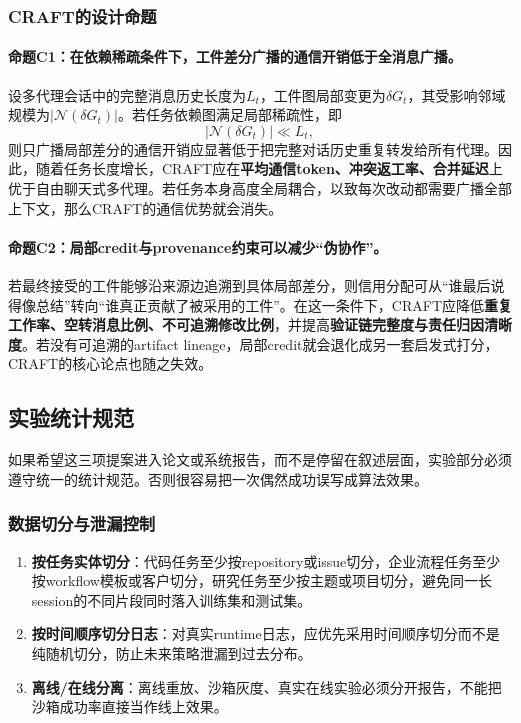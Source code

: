 \documentclass[12pt,a4paper]{article}
\begin{document}
\subsubsection{CRAFT的设计命题}

\paragraph{命题C1：在依赖稀疏条件下，工件差分广播的通信开销低于全消息广播。}
设多代理会话中的完整消息历史长度为$L_t$，工件图局部变更为$\delta G_t$，其受影响邻域规模为$|\mathcal{N}(\delta G_t)|$。若任务依赖图满足局部稀疏性，即
\begin{equation}
|\mathcal{N}(\delta G_t)| \ll L_t,
\end{equation}
则只广播局部差分的通信开销应显著低于把完整对话历史重复转发给所有代理。因此，随着任务长度增长，CRAFT应在\textbf{平均通信token、冲突返工率、合并延迟}上优于自由聊天式多代理。若任务本身高度全局耦合，以致每次改动都需要广播全部上下文，那么CRAFT的通信优势就会消失。

\paragraph{命题C2：局部credit与provenance约束可以减少“伪协作”。}
若最终接受的工件能够沿来源边追溯到具体局部差分，则信用分配可从“谁最后说得像总结”转向“谁真正贡献了被采用的工件”。在这一条件下，CRAFT应降低\textbf{重复工作率、空转消息比例、不可追溯修改比例}，并提高\textbf{验证链完整度与责任归因清晰度}。若没有可追溯的artifact lineage，局部credit就会退化成另一套启发式打分，CRAFT的核心论点也随之失效。

\subsection{实验统计规范}

如果希望这三项提案进入论文或系统报告，而不是停留在叙述层面，实验部分必须遵守统一的统计规范。否则很容易把一次偶然成功误写成算法效果。

\subsubsection{数据切分与泄漏控制}

\begin{enumerate}
    \item \textbf{按任务实体切分}：代码任务至少按repository或issue切分，企业流程任务至少按workflow模板或客户切分，研究任务至少按主题或项目切分，避免同一长session的不同片段同时落入训练集和测试集。
    \item \textbf{按时间顺序切分日志}：对真实runtime日志，应优先采用时间顺序切分而不是纯随机切分，防止未来策略泄漏到过去分布。
    \item \textbf{离线/在线分离}：离线重放、沙箱灰度、真实在线实验必须分开报告，不能把沙箱成功率直接当作线上效果。
\end{enumerate}
\end{document}
